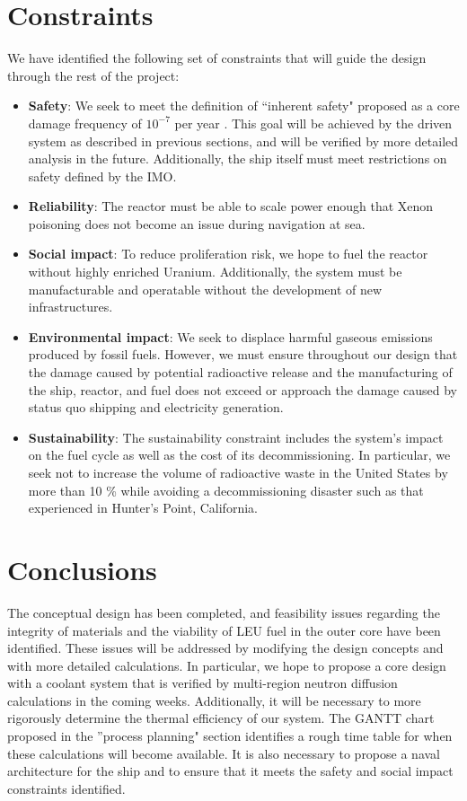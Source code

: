 \documentclass[12pt]{article}
\begin{document}
\section{Constraints}
We have identified the following set of constraints that will guide the design through the rest of the project:
\begin{itemize}
\item \textbf{Safety}: We seek to meet the definition of ``inherent safety" proposed as a core damage frequency of $10^{-7}$ per year \cite{inherenty_safe}. This goal will be achieved by the driven system as described in previous sections, and will be verified by more detailed analysis in the future. Additionally, the ship itself must meet restrictions on safety defined by the IMO.
\item \textbf{Reliability}: The reactor must be able to scale power enough that Xenon poisoning does not become an issue during navigation at sea.
\item \textbf{Social impact}: To reduce proliferation risk, we hope to fuel the reactor without highly enriched Uranium. Additionally, the system must be manufacturable and operatable without the development of new infrastructures.
\item \textbf{Environmental impact}: We seek to displace harmful gaseous emissions produced by fossil fuels. However, we must ensure throughout our design that the damage caused by potential radioactive release and the manufacturing of the ship, reactor, and fuel does not exceed or approach the damage caused by status quo shipping and electricity generation.
\item \textbf{Sustainability}: The sustainability constraint includes the system's impact on the fuel cycle as well as the cost of its decommissioning. In particular, we seek not to increase the volume of radioactive waste in the United States by more than 10 \% while avoiding a decommissioning disaster such as that experienced in Hunter's Point, California.
\end{itemize}
\section{Conclusions}
The conceptual design has been completed, and feasibility issues regarding the integrity of materials and the viability of LEU fuel in the outer core have been identified. These issues will be addressed by modifying the design concepts and with more detailed calculations. In particular, we hope to propose a core design with a coolant system that is verified by multi-region neutron diffusion calculations in the coming weeks. Additionally, it will be necessary to more rigorously determine the thermal efficiency of our system. The GANTT chart proposed in the ''process planning" section identifies a rough time table for when these calculations will become available. It is also necessary to propose a naval architecture for the ship and to ensure that it meets the safety and social impact constraints identified. 
\end{document}
